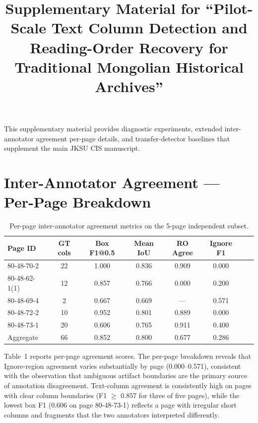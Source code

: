\documentclass[pdflatex,sn-mathphys-num]{sn-jnl}
\begin{document}
\title{Supplementary Material for ``Pilot-Scale Text Column Detection and Reading-Order Recovery for Traditional Mongolian Historical Archives''}
\author[1]{ }
\author*[2]{ }
\date{}
\maketitle

This supplementary material provides diagnostic experiments, extended inter-annotator agreement per-page details, and transfer-detector baselines that supplement the main JKSU CIS manuscript.

\section{Inter-Annotator Agreement --- Per-Page Breakdown}

\begin{table}[t]
\centering
\scriptsize\setlength{\tabcolsep}{2pt}
\caption{Per-page inter-annotator agreement metrics on the 5-page independent subset.}
\begin{tabular}{lccccccc}
\toprule
Page ID & GT cols & Box F1@0.5 & Mean IoU & RO Agree & Ignore F1 \\
\midrule
80-48-70-2 & 22 & 1.000 & 0.836 & 0.909 & 0.000 \\
80-48-62-1(1) & 12 & 0.857 & 0.766 & 0.000 & 0.200 \\
80-48-69-4 & 2 & 0.667 & 0.669 & --- & 0.571 \\
80-48-72-2 & 10 & 0.952 & 0.801 & 0.889 & 0.000 \\
80-48-73-1 & 20 & 0.606 & 0.765 & 0.911 & 0.400 \\
\midrule
Aggregate & 66 & 0.852 & 0.800 & 0.677 & 0.286 \\
\bottomrule
\end{tabular}
\end{table}

Table~1 reports per-page agreement scores. The per-page breakdown reveals that Ignore-region agreement varies substantially by page (0.000--0.571), consistent with the observation that ambiguous artifact boundaries are the primary source of annotation disagreement. Text-column agreement is consistently high on pages with clear column boundaries (F1 $\ge$ 0.857 for three of five pages), while the lowest box F1 (0.606 on page 80-48-73-1) reflects a page with irregular short columns and fragments that the two annotators interpreted differently.
\end{document}
